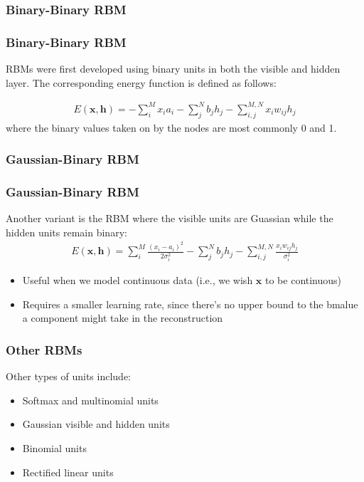 \documentclass[norsk,a4paper,11pt]{beamer}
\begin{document}
\subsubsection{Binary-Binary RBM}
\begin{frame}
\frametitle{Binary-Binary RBM}
RBMs were first developed using binary units in both the visible and hidden layer. The corresponding energy function is defined as follows:

\begin{align}
	E(\bm{x}, \mathbf{h}) = - \sum_i^M x_i a_i- \sum_j^N b_j h_j - \sum_{i,j}^{M,N} x_i w_{ij} h_j
\end{align}
where the binary values taken on by the nodes are most commonly 0 and 1.
\end{frame}

\subsubsection{Gaussian-Binary RBM}
\begin{frame}
\frametitle{Gaussian-Binary RBM}
Another variant is the RBM where the visible units are Guassian while the hidden units remain binary:
\begin{align}
	E(\bm{x}, \mathbf{h}) = \sum_i^M \frac{(x_i - a_i)^2}{2\sigma_i^2} - \sum_j^N b_j h_j - \sum_{i,j}^{M,N} \frac{x_i w_{ij} h_j}{\sigma_i^2} 
\end{align}
\begin{itemize}
	\item Useful when we model continuous data (i.e., we wish $\bm{x}$ to be continuous)
	\item Requires a smaller learning rate, since there's no upper bound to the bm{a}lue a component might take in the reconstruction
\end{itemize}
\end{frame}

\subsubsection{Other RBMs}
\begin{frame}
Other types of units include:
\begin{itemize}
	\item Softmax and multinomial units
	\item Gaussian visible and hidden units
	\item Binomial units
	\item Rectified linear units
\end{itemize}
\end{frame}
\end{document}
